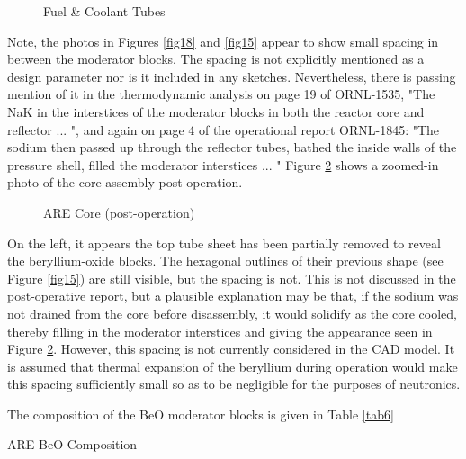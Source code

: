 \documentclass[ms,a4paper]{memoir}
\newcommand*{\msrarchive}{../../msr-archive}%
\begin{document}
\begin{figure}[H]
  \centering
  \caption{Fuel \& Coolant Tubes \parencite[Figure 12]{ornl-1634}}
  \label{fig17}
\end{figure}

Note, the photos in Figures \ref{fig18} and \ref{fig15} appear to show small spacing in between the moderator blocks. The spacing is not explicitly mentioned as a design parameter nor is it included in any sketches. Nevertheless, there is passing mention of it in the thermodynamic analysis on page 19 of ORNL-1535, "The NaK in the interstices of the moderator blocks in both the reactor core and reflector ... ", and again on page 4 of the operational report ORNL-1845: "The sodium then passed up through the reflector tubes, bathed the inside walls of the pressure shell, filled the moderator interstices ... " Figure \ref{fig16} shows a zoomed-in photo of the core assembly post-operation.

\begin{figure}[H]
  \centering
  \caption{ARE Core (post-operation)\parencite[Figure 19]{ornl-1868}}
  \label{fig16}
\end{figure}

On the left, it appears the top tube sheet has been partially removed to reveal the beryllium-oxide blocks. The hexagonal outlines of their previous shape (see Figure \ref{fig15}) are still visible, but the spacing is not. This is not discussed in the post-operative report, but a plausible explanation may be that, if the sodium was not drained from the core before disassembly, it would solidify as the core cooled, thereby filling in the moderator interstices and giving the appearance seen in Figure \ref{fig16}. However, this spacing is not currently considered in the CAD model. It is assumed that thermal expansion of the beryllium during operation would make this spacing sufficiently small so as to be negligible for the purposes of neutronics.

The composition of the BeO moderator blocks is given in Table \ref{tab6}

\begin{table}[H]
  \centering
  \caption{ARE BeO Composition \parencite[Appendix B.2.a]{ornl-1845}}
  \label{tab6}
\end{table}
\end{document}
